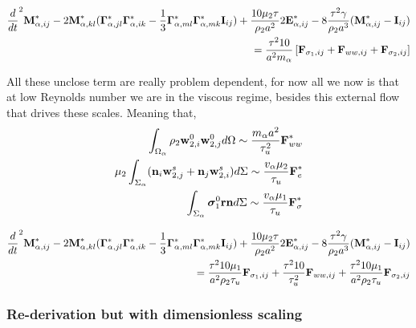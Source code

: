 \begin{align*}
    \frac{d}{d t}^2 \textbf{M}_{\alpha,ij}^*
    -2  \textbf{M}_{\alpha,kl}^* 
    (\bm\Gamma_{\alpha,jl}^*\bm\Gamma_{\alpha,ik}^*  
    - \frac{1}{3}
    \bm\Gamma_{\alpha,ml}^*\bm\Gamma_{\alpha,mk}^*  
    \textbf{I}_{ij}
    )
    + \frac{10 \mu_2 \tau}{ \rho_2 a^2} 2\textbf{E}_{\alpha,ij}^*
    - 8 \frac{\tau^2 \gamma  }{\rho_2 a^3} 
     (\textbf{M}_{\alpha,ij}^*- \textbf{I}_{ij})\\
    = 
    \frac{\tau^2 10}{a^2 m_\alpha}
    \left[\textbf{F}_{\sigma_1, ij}
    + \textbf{F}_{ww, ij}
    + \textbf{F}_{\sigma_2, ij}\right]
\end{align*}

All these unclose term are really problem dependent, for now all we now is that at low Reynolds number we are in the viscous regime, besides this external flow that drives these scales. 
Meaning that, 
\begin{align*}
    \int_{\Omega_\alpha} \rho_2 \textbf{w}_{2,i}^0\textbf{w}_{2,j}^0 d\Omega
    \sim \frac{m_\alpha a^2}{\tau_u^2} \textbf{F}_{ww}^*
    \\
    \mu_2 \int_{\Sigma_\alpha} (\textbf{n}_i \textbf{w}_{2,j}^s + \textbf{n}_j \textbf{w}_{2,i}^s) d\Sigma
    \sim \frac{v_\alpha \mu_2}{\tau_u} \textbf{F}_{e}^*
    \\
    \int_{\Sigma_\alpha} \bm\sigma_1^0 \textbf{rn} d\Sigma
    \sim 
    \frac{v_\alpha \mu_1}{\tau_u} \textbf{F}_{\sigma}^*
\end{align*} 

\begin{align*}
    \frac{d}{d t}^2 \textbf{M}_{\alpha,ij}^*
    -2  \textbf{M}_{\alpha,kl}^* 
    (\bm\Gamma_{\alpha,jl}^*\bm\Gamma_{\alpha,ik}^*  
    - \frac{1}{3}
    \bm\Gamma_{\alpha,ml}^*\bm\Gamma_{\alpha,mk}^*  
    \textbf{I}_{ij}
    )
    + \frac{10 \mu_2 \tau}{ \rho_2 a^2} 2\textbf{E}_{\alpha,ij}^*
    - 8 \frac{\tau^2 \gamma  }{\rho_2 a^3} 
     (\textbf{M}_{\alpha,ij}^*- \textbf{I}_{ij})\\
    = 
    \frac{\tau^2 10 \mu_1 }{a^2 \rho_2 \tau_u}
    \textbf{F}_{\sigma_1, ij}
    + \frac{\tau^2 10}{\tau_u^2} \textbf{F}_{ww, ij}
    + \frac{\tau^2 10 \mu_1 }{a^2 \rho_2 \tau_u} \textbf{F}_{\sigma_2, ij}
\end{align*}


\subsubsection*{Re-derivation but with dimensionless scaling}

